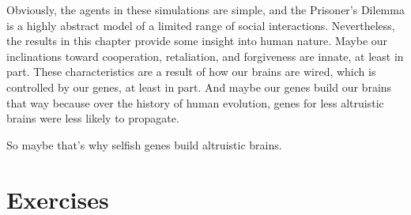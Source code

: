 \documentclass[12pt]{book}
\theoremstyle{exercise}
\begin{document}
Obviously, the agents in these simulations are simple, and the Prisoner's Dilemma is a highly abstract model of a limited range of social interactions.  Nevertheless, the results in this chapter provide some insight into human nature.  Maybe our inclinations toward cooperation, retaliation, and forgiveness are innate, at least in part.  These characteristics are a result of how our brains are wired, which is controlled by our genes, at least in part.  And maybe our genes build our brains that way because over the history of human evolution, genes for less altruistic brains were less likely to propagate.

So maybe that's why selfish genes build altruistic brains.


\section{Exercises}
\end{document}
